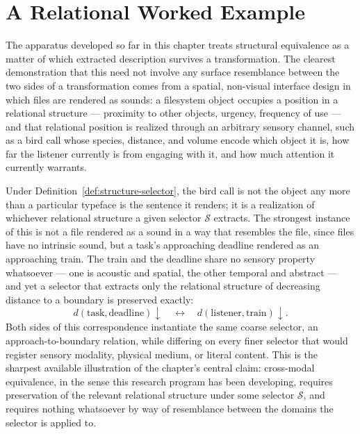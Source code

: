 \section{A Relational Worked Example}

The apparatus developed so far in this chapter treats structural equivalence as a matter of which extracted description survives a transformation. The clearest demonstration that this need not involve any surface resemblance between the two sides of a transformation comes from a spatial, non-visual interface design in which files are rendered as sounds: a filesystem object occupies a position in a relational structure --- proximity to other objects, urgency, frequency of use --- and that relational position is realized through an arbitrary sensory channel, such as a bird call whose species, distance, and volume encode which object it is, how far the listener currently is from engaging with it, and how much attention it currently warrants.

Under Definition~\ref{def:structure-selector}, the bird call is not the object any more than a particular typeface is the sentence it renders; it is a realization of whichever relational structure a given selector $\mathcal{S}$ extracts. The strongest instance of this is not a file rendered as a sound in a way that resembles the file, since files have no intrinsic sound, but a task's approaching deadline rendered as an approaching train. The train and the deadline share no sensory property whatsoever --- one is acoustic and spatial, the other temporal and abstract --- and yet a selector that extracts only the relational structure of decreasing distance to a boundary is preserved exactly:
\[
d(\text{task}, \text{deadline}) \downarrow \quad \longleftrightarrow \quad d(\text{listener}, \text{train}) \downarrow.
\]
Both sides of this correspondence instantiate the same coarse selector, an approach-to-boundary relation, while differing on every finer selector that would register sensory modality, physical medium, or literal content. This is the sharpest available illustration of the chapter's central claim: cross-modal equivalence, in the sense this research program has been developing, requires preservation of the relevant relational structure under some selector $\mathcal{S}$, and requires nothing whatsoever by way of resemblance between the domains the selector is applied to.
